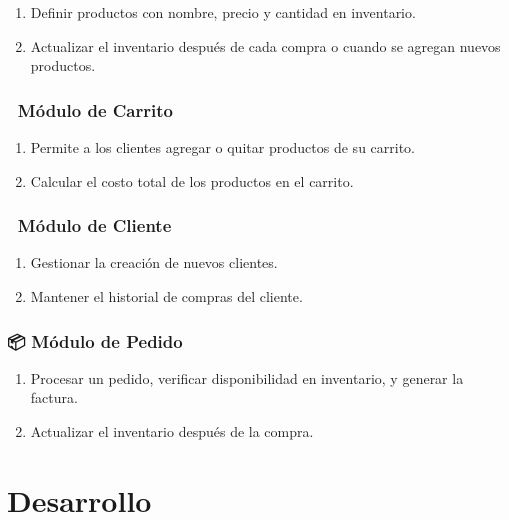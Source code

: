 \documentclass[
  a4paper,
  DIV=11,
  numbers=noendperiod,
  onepage,
  openany]{scrreprt}
\providecommand{\tightlist}{%
  \setlength{\itemsep}{0pt}\setlength{\parskip}{0pt}}\usepackage{longtable,booktabs,array}
\begin{document}
\begin{enumerate}
\def\labelenumi{\arabic{enumi}.}
\tightlist
\item
  Definir productos con nombre, precio y cantidad en inventario.
\item
  Actualizar el inventario después de cada compra o cuando se agregan
  nuevos productos.
\end{enumerate}

\subsection{🛒 Módulo de Carrito}\label{muxf3dulo-de-carrito}

\begin{enumerate}
\def\labelenumi{\arabic{enumi}.}
\tightlist
\item
  Permite a los clientes agregar o quitar productos de su carrito.
\item
  Calcular el costo total de los productos en el carrito.
\end{enumerate}

\subsection{👤 Módulo de Cliente}\label{muxf3dulo-de-cliente}

\begin{enumerate}
\def\labelenumi{\arabic{enumi}.}
\tightlist
\item
  Gestionar la creación de nuevos clientes.
\item
  Mantener el historial de compras del cliente.
\end{enumerate}

\subsection{📦 Módulo de Pedido}\label{muxf3dulo-de-pedido}

\begin{enumerate}
\def\labelenumi{\arabic{enumi}.}
\tightlist
\item
  Procesar un pedido, verificar disponibilidad en inventario, y generar
  la factura.
\item
  Actualizar el inventario después de la compra.
\end{enumerate}

\chapter{Desarrollo}\label{desarrollo-1}
\end{document}
